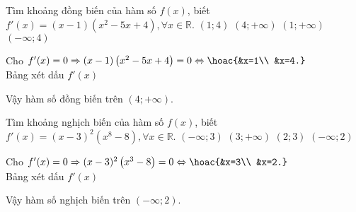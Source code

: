 \begin{ex}%
    Tìm khoảng đồng biến của hàm số $ f(x)$, biết $f'(x)=(x-1)\left(x^2-5x+4\right),\forall x\in\mathbb{R}$.
    \choice
    {$(1 ; 4)$ }
    { \True $(4 ;+\infty)$}
    { $(1 ;+\infty)$ }
    { $(-\infty ; 4)$}
    \loigiai
    {
        Cho $f'(x)=0 \Rightarrow (x-1)\left(x^2-5x+4\right)=0 \Leftrightarrow \hoac{&x=1\\ &x=4.}$\\
        Bảng xét dấu $f'(x)$
        \begin{center}
        \end{center}
        Vậy hàm số đồng biến trên $(4;+\infty)$.
    }
\end{ex}
\begin{ex}%
    Tìm khoảng nghịch biến của hàm số $f(x)$,
    biết $f'(x)=(x-3)^2\left(x^8-8\right),\forall x\in\mathbb{R}$.
    \choice
    { $(-\infty ; 3)$}
    {$(3 ;+\infty)$ }
    { $(2 ; 3)$ }
    {\True $(-\infty ; 2)$}
    \loigiai
    {
        Cho $f'(x)=0 \Rightarrow (x-3)^2\left(x^3-8\right)=0 \Leftrightarrow \hoac{&x=3\\ &x=2.}$\\
        Bảng xét dấu $f'(x)$
        \begin{center}
        \end{center}
        Vậy hàm số nghịch biến trên $(-\infty; 2)$.
    }
\end{ex}
